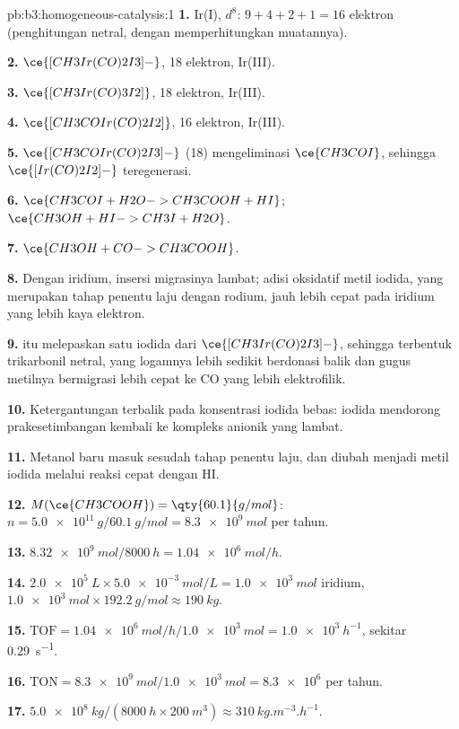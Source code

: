 \begin{solution}{pb:b3:homogeneous-catalysis:1}
\textbf{1.} Ir(I), $d^8$: $9 + 4 + 2 + 1 = 16$ elektron (penghitungan netral, dengan memperhitungkan muatannya).

\textbf{2.} $\ce{[CH3Ir(CO)2I3]-}$, 18 elektron, Ir(III).

\textbf{3.} $\ce{[CH3Ir(CO)3I2]}$, 18 elektron, Ir(III).

\textbf{4.} $\ce{[CH3COIr(CO)2I2]}$, 16 elektron, Ir(III).

\textbf{5.} $\ce{[CH3COIr(CO)2I3]-}$ (18) mengeliminasi $\ce{CH3COI}$, sehingga $\ce{[Ir(CO)2I2]-}$ teregenerasi.

\textbf{6.} $\ce{CH3COI + H2O -> CH3COOH + HI}$; $\ce{CH3OH + HI -> CH3I + H2O}$.

\textbf{7.} $\ce{CH3OH + CO -> CH3COOH}$.

\textbf{8.} Dengan iridium, insersi migrasinya lambat; adisi oksidatif
metil iodida, yang merupakan tahap penentu laju dengan rodium, jauh lebih cepat pada iridium yang lebih
kaya elektron.

\textbf{9.}  itu melepaskan satu iodida dari $\ce{[CH3Ir(CO)2I3]-}$, sehingga terbentuk trikarbonil netral, yang
logamnya lebih sedikit berdonasi balik dan gugus metilnya bermigrasi lebih cepat ke CO yang lebih
elektrofilik.

\textbf{10.} Ketergantungan terbalik pada konsentrasi iodida bebas: iodida mendorong
prakesetimbangan kembali ke kompleks anionik yang lambat.

\textbf{11.} Metanol baru masuk sesudah tahap penentu laju, dan diubah menjadi
metil iodida melalui reaksi cepat dengan HI.

\textbf{12.} $M(\ce{CH3COOH}) = \qty{60.1}{g/mol}$: $n = \qty{5.0e11}{g}/\qty{60.1}{g/mol} = \qty{8.3e9}{mol}$ per tahun.

\textbf{13.} $\qty{8.32e9}{mol}/\qty{8000}{h} = \qty{1.04e6}{mol/h}$.

\textbf{14.} $\qty{2.0e5}{L} \times \qty{5.0e-3}{mol/L} = \qty{1.0e3}{mol}$ iridium, $\qty{1.0e3}{mol} \times \qty{192.2}{g/mol} \approx \qty{190}{kg}$.

\textbf{15.} $\mathrm{TOF} = \qty{1.04e6}{mol/h}/\qty{1.0e3}{mol} = \qty{1.0e3}{h^{-1}}$, sekitar \qty{0.29}{s^{-1}}.

\textbf{16.} $\mathrm{TON} = \qty{8.3e9}{mol}/\qty{1.0e3}{mol} = \num{8.3e6}$ per tahun.

\textbf{17.} $\qty{5.0e8}{kg}/(\qty{8000}{h} \times \qty{200}{m^3}) \approx \qty{310}{kg.m^{-3}.h^{-1}}$.


\end{solution}
